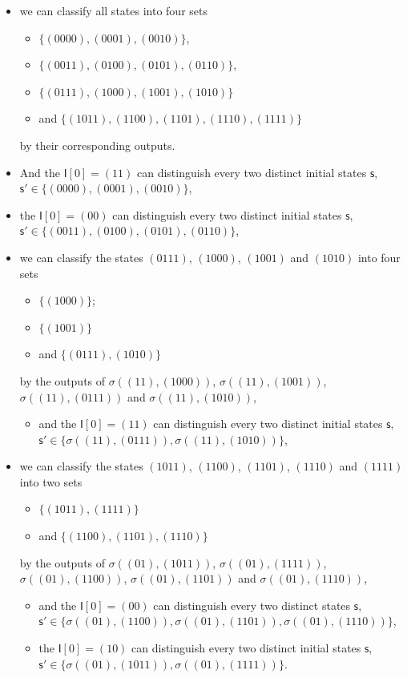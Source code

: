 \begin{itemize}
  \item we can classify all states into four sets 
  \begin{itemize}
   \item $\{(0000),(0001),(0010)\}$,
   \item $\{(0011),(0100),(0101),(0110)\}$,
   \item $\{(0111),(1000),(1001),(1010)\}$
   \item and $\{(1011),(1100),(1101),(1110),(1111)\}$
  \end{itemize} 
    by their corresponding outputs.  
  \item And the $\mathsf{I}[0]=(11)$ can distinguish every two distinct initial states $\mathsf{s}$, $\mathsf{s}'\in \{(0000),(0001),(0010)\}$, 
  \item the $\mathsf{I}[0]=(00)$ can distinguish every two distinct initial states $\mathsf{s}$, $\mathsf{s}'\in \{(0011),(0100),(0101),(0110)\}$,
  \item we can classify the states $(0111)$, $(1000)$, $(1001)$ and $(1010)$ into four sets 
   \begin{itemize}
   \item $\{(1000)\}$;
   \item  $\{(1001)\}$
   \item and $\{(0111),(1010)\}$
   \end{itemize} 
  by the outputs of $\sigma ((11), (1000))$, $\sigma ((11), (1001))$, $\sigma ((11), (0111))$ and $\sigma ((11), (1010))$,
  \begin{itemize}
  \item  and the $\mathsf{I}[0]=(11)$ can distinguish every two distinct initial states $\mathsf{s}$, $\mathsf{s}'\in \{\sigma ((11), (0111)),\sigma ((11), (1010))\}$,
  \end{itemize}
  \item we can classify the states $(1011)$, $(1100)$, $(1101)$, $(1110)$ and $(1111)$  into two sets 
    \begin{itemize}
   \item  $\{(1011),(1111)\}$
   \item and $\{(1100),(1101),(1110)\}$
  \end{itemize}
    by the outputs of $\sigma ((01), (1011))$, $\sigma ((01), (1111))$, $\sigma ((01), (1100))$, $\sigma ((01), (1101))$ and $\sigma ((01), (1110))$,
  \begin{itemize}
  \item  and the $\mathsf{I}[0]=(00)$ can distinguish every two distinct states $\mathsf{s}$, $\mathsf{s}'\in \{\sigma ((01), (1100)),\sigma ((01), (1101)), \sigma ((01), (1110))\}$,
   \item  the $\mathsf{I}[0]=(10)$ can distinguish every two distinct initial states $\mathsf{s}$, $\mathsf{s}'\in \{\sigma ((01), (1011)),\sigma ((01), (1111))\}$.
  \end{itemize}
\end{itemize} 
